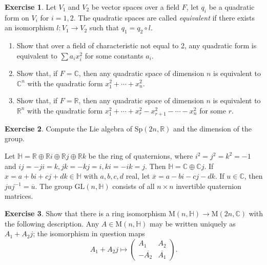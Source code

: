 \documentclass[12pt,reqno]{book}%
\theoremstyle{definition}
\newtheorem{exercise}{Exercise}[chapter]
\theoremstyle{remark}
\theoremstyle{theorem}
\theoremstyle{remark}
\begin{document}
\begin{exercise}\label{}
    Let $V_1$ and $V_2$ be vector spaces over a field $F$, let $q_i$ be a quadratic form on $V_i$ for $i = 1, 2$.
    The quadratic spaces are called \emph{equivalent} if there exists an isomorphism $l : V_1 \to V_2$ such that $q_1 = q_2 \circ l$.
    \begin{enumerate}[label=(\roman*),font=\normalfont,before=\normalfont]
        \item Show that over a field of characteristic not equal to 2, any quadratic form is equivalent to $\sum a_i x_i^2$ for some constants $a_i$.
        \item Show that, if $F = \mathbb{C}$, then any quadratic space of dimension $n$ is equivalent to $\mathbb{C}^{n}$ with the quadratic form $x_1^2 + \cdots + x_n^2$.
        \item Show that, if $F = \mathbb{R}$, then any quadratic space of dimension $n$ is equivalent to $\mathbb{R}^{n}$ with the quadratic form $x_1^2 + \cdots + x_r^2 - x_{r+1}^2 - \cdots - x_n^2$ for some $r$.
    \end{enumerate}
\end{exercise}

\begin{exercise}\label{}
    Compute the Lie algebra of $\mathrm{Sp}(2n, \mathbb{R})$ and the dimension of the group.
\end{exercise}

Let $\mathbb{H} = \mathbb{R} \oplus \mathbb{R}i \oplus \mathbb{R}j \oplus \mathbb{R}k$ be the ring of quaternions, where $i^2 = j^2 = k^2 = -1$ and $ij = -ji = k, jk = -kj = i, ki = -ik = j$.
Then $\mathbb{H} = \mathbb{C} \oplus \mathbb{C}j$.
If $x = a + bi + cj + dk \in \mathbb{H}$ with $a, b, c, d$ real, let $\overline{x} = a - bi - cj - dk$.
If $u \in \mathbb{C}$, then $juj^{-1} = \overline{u}$.
The group $\mathrm{GL}(n,\mathbb{H})$ consists of all $n \times n$ invertible quaternion matrices.

\begin{exercise}\label{}
    Show that there is a ring isomorphism $\mathrm{M}(n,\mathbb{H}) \to \mathrm{M}(2n,\mathbb{C})$ with the following description.
    Any $A \in \mathrm{M}(n,\mathbb{H})$ may be written uniquely as $A_1 + A_2j$; the isomorphism in question maps
    \[
        A_1 + A_2j \mapsto \begin{pmatrix}
            A_1 & A_2  \\
            -\overline{A_2} & \overline{A_1}
        \end{pmatrix}.
    \]
\end{exercise}
\end{document}
